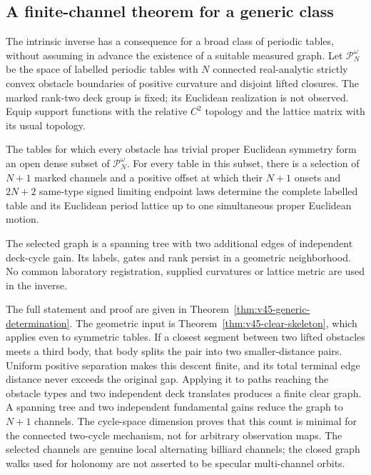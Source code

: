 \subsection{A finite-channel theorem for a generic class}
\label{subsec:v45-intro-generic}

The intrinsic inverse has a consequence for a broad class of periodic
tables, without assuming in advance the existence of a suitable measured
graph.  Let $\mathscr P_N^\omega$ be the space of labelled periodic tables
with $N$ connected real-analytic strictly convex obstacle boundaries of
positive curvature and disjoint lifted closures.  The marked rank-two deck
group is fixed; its Euclidean realization is not observed.  Equip support
functions with the relative $C^2$ topology and the lattice matrix with its
usual topology.

\begin{theorem}
\label{thm:v45-intro-finite-channel}
The tables for which every obstacle has trivial proper Euclidean symmetry
form an open dense subset of $\mathscr P_N^\omega$.  For every table in
this subset, there is a selection of $N+1$ marked channels and a positive
offset at which their $N+1$ onsets and $2N+2$ same-type signed limiting
endpoint laws determine the complete labelled table and its Euclidean
period lattice up to one simultaneous proper Euclidean motion.

The selected graph is a spanning tree with two additional edges of
independent deck-cycle gain.  Its labels, gates and rank persist in a
geometric neighborhood.  No common laboratory registration, supplied
curvatures or lattice metric are used in the inverse.
\end{theorem}

The full statement and proof are given in
Theorem~\ref{thm:v45-generic-determination}.  The geometric input is
Theorem~\ref{thm:v45-clear-skeleton}, which applies even to symmetric tables.
If a closest segment between two lifted obstacles meets a third body, that
body splits the pair into two smaller-distance pairs.  Uniform positive
separation makes this descent finite, and its total terminal edge distance
never exceeds the original gap.  Applying it to paths reaching the obstacle
types and two independent deck translates produces a finite clear graph.
A spanning tree and two independent fundamental gains reduce the graph to
$N+1$ channels.  The cycle-space dimension proves that this count is minimal
for the connected two-cycle mechanism, not for arbitrary observation maps.
The selected channels are genuine local alternating billiard channels;
the closed graph walks used for holonomy are not asserted to be specular
multi-channel orbits.

